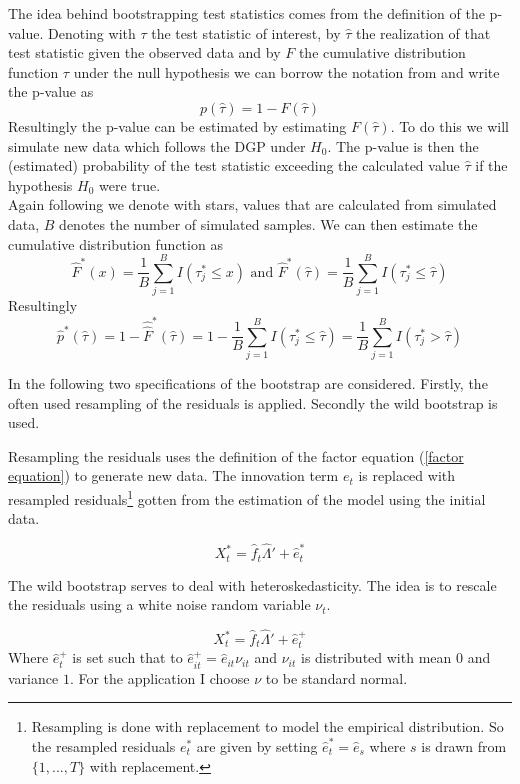 \documentclass[12pt]{article}
\begin{document}
The idea behind bootstrapping test statistics comes from the definition of the p-value. Denoting with $\tau$ the test statistic of interest, by $\hat \tau$ the realization of that test statistic given the observed data and by $F$ the cumulative distribution function $\tau$ under the null hypothesis we can borrow the notation from \citet{davidson2004econometric} and write the p-value as
$$p(\hat \tau) = 1 - F(\hat \tau)$$
Resultingly the p-value can be estimated by estimating $F(\hat \tau)$. To do this we will simulate new data which follows the DGP under $H_0$. The p-value is then the (estimated) probability of the test statistic exceeding the calculated value $\hat \tau$ if the hypothesis $H_0$ were true. \\

Again following \citet{davidson2004econometric} we denote with stars, values that are calculated from simulated data, $B$ denotes the number of simulated samples. We can then estimate the cumulative distribution function as 
$$\hat F^*(x) = \frac{1}{B} \sum_{j=1}^B I(\tau^*_j \leq x) \text{ and } \hat F^*(\hat \tau) = \frac{1}{B} \sum_{j=1}^B I(\tau^*_j \leq \hat \tau)$$
Resultingly
$$\hat p^*(\hat \tau) = 1 - \hat \hat F^*(\hat \tau) = 1 - \frac{1}{B} \sum_{j=1}^B I (\tau^*_j \leq \hat \tau) = \frac{1}{B}\sum_{j=1}^B I(\tau^*_j > \hat \tau)$$

In the following two specifications of the bootstrap are considered. Firstly, the often used resampling of the residuals is applied. Secondly the wild bootstrap is used. 

Resampling the residuals uses the definition of the factor equation (\ref{factor equation}) to generate new data. The innovation term $e_t$ is replaced with resampled residuals\footnote{Resampling is done with replacement to model the empirical distribution. So the resampled residuals $e_t^*$ are given by setting $\hat e_t^* = \hat e_s$ where $s$ is drawn from $\{1, ..., T\}$ with replacement.} gotten from the estimation of the model using the initial data.

\begin{equation}
	\label{factor equation, bootstrapped}
	X_t^* = \hat f_t \hat \Lambda' + \hat e_t^*
\end{equation}

The wild bootstrap serves to deal with heteroskedasticity. The idea is to rescale the residuals using a white noise random variable $\nu_t$.

$$X_t^* = \hat f_t \hat \Lambda' + \hat e_t^+$$
Where $\hat e_t^+$ is set such that to $\hat e_{it}^+ = \hat e_{it} \nu_{it}$ and $\nu_{it}$ is distributed with mean $0$ and variance $1$. For the application I choose $\nu$ to be standard normal.
\end{document}
